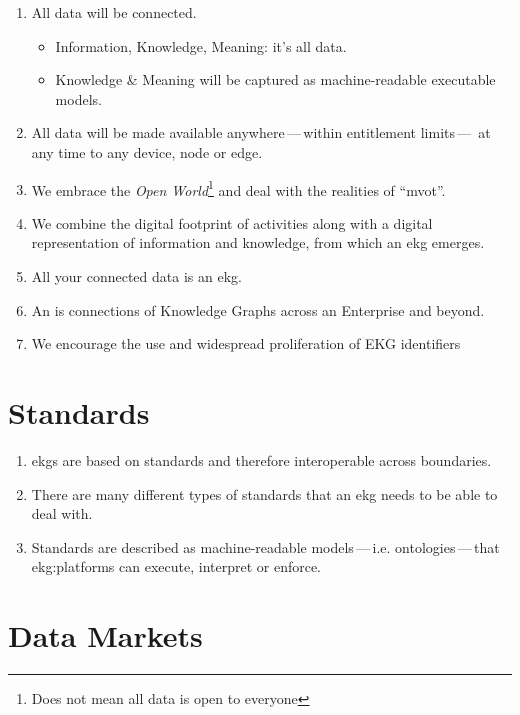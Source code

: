 \begin{enumerate}
    \item All data will be connected.
          \begin{itemize}
              \item Information, Knowledge, Meaning: it's all data.
              \item Knowledge \& Meaning will be captured as machine-readable executable models.
          \end{itemize}
    \item All data will be made available anywhere\,---\,within entitlement limits\,---\,%
          at any time to any device, node or edge.
    \item We embrace the \textit{Open World}\footnote{Does not mean all data is open to everyone} and deal
          with the realities of \enquote{\gls{mvot}}.
    \item We combine the digital footprint of activities along with a digital representation of
          information and knowledge, from which an \gls{ekg} emerges.
    \item All your connected data is an \gls{ekg}.
    \item An  is connections of Knowledge Graphs across an Enterprise and beyond.
    \item We encourage the use and widespread proliferation of EKG identifiers
\end{enumerate}

\section{Standards}

\begin{enumerate}
    \item \Glspl{ekg} are based on standards and therefore interoperable across boundaries.
    \item There are many different types of standards that an \gls{ekg} needs to be able to deal with.
    \item Standards are described as machine-readable models\,---\,i.e. ontologies\,---\,that \glspl{ekg:platform}
          can execute, interpret or enforce.
\end{enumerate}

\section{Data Markets}

